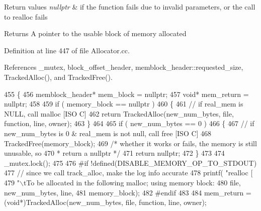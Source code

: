 \begin{DoxyRetVals}{Return values}
{\em nullptr} & if the function fails due to invalid parameters, or the call to realloc fails \\
\hline
\end{DoxyRetVals}
\begin{DoxyReturn}{Returns}
A pointer to the usable block of memory allocated 
\end{DoxyReturn}


Definition at line 447 of file Allocator.\-cc.



References \-\_\-mutex, block\-\_\-offset\-\_\-header, memblock\-\_\-header\-::requested\-\_\-size, Tracked\-Alloc(), and Tracked\-Free().


\begin{DoxyCode}
455 \{
456         memblock_header*        mem\_block = \textcolor{keyword}{nullptr};
457         \textcolor{keywordtype}{void}*                   mem\_return = \textcolor{keyword}{nullptr};
458 
459         \textcolor{keywordflow}{if} ( memory\_block == \textcolor{keyword}{nullptr} )
460         \{
461                 \textcolor{comment}{// if real\_mem is NULL, call malloc [ISO C]}
462                 \textcolor{keywordflow}{return} TrackedAlloc(new\_num\_bytes, file, \textcolor{keyword}{function}, line, owner);
463         \}
464 
465         \textcolor{keywordflow}{if} ( new\_num\_bytes == 0 )
466         \{
467                 \textcolor{comment}{// if new\_num\_bytes is 0 & real\_mem is not null, call free [ISO C]}
468                 TrackedFree(memory\_block);
469                 \textcolor{comment}{/* whether it works or fails, the memory is still unusable, so
}
470 \textcolor{comment}{                 * return a nullptr */}
471                 \textcolor{keywordflow}{return} \textcolor{keyword}{nullptr};
472         \}
473 
474         _mutex.lock();
475 
476 \textcolor{preprocessor}{#if !defined(DISABLE\_MEMORY\_OP\_TO\_STDOUT)
}
477 \textcolor{preprocessor}{}        \textcolor{comment}{// since we call track\_alloc, make the log info accurate}
478         printf( \textcolor{stringliteral}{"realloc [%
479                 \textcolor{stringliteral}{"\(\backslash\)tTo be allocated in the following malloc; using memory block: %
480                 file, new\_num\_bytes, line,
481                 memory\_block);
482 \textcolor{preprocessor}{#endif
}
483 \textcolor{preprocessor}{}
484         mem\_return = (\textcolor{keywordtype}{void}*)TrackedAlloc(new\_num\_bytes, file, \textcolor{keyword}{function}, line, owner);
}}
\end{DoxyCode}
